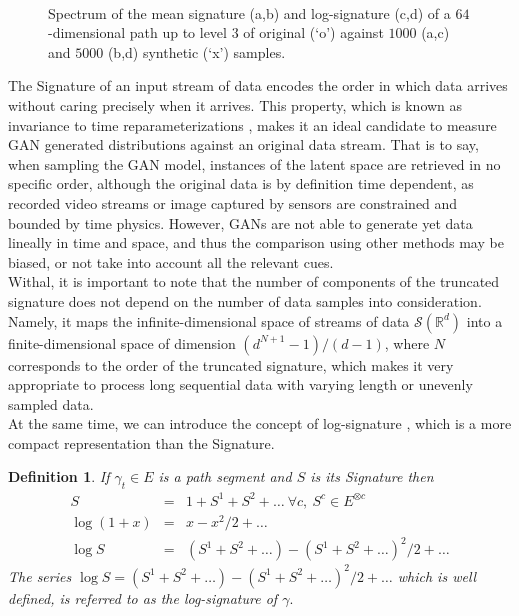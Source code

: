 \documentclass[lettersize,journal]{IEEEtran}
\newtheorem{definition}{Definition}
\begin{document}
\begin{figure}[ht]
\centering
{}
\\
\caption{Spectrum of the mean signature (a,b) and log-signature (c,d) of a $64$-dimensional path up to level $3$ of original (`o') against $1000$ (a,c) and $5000$ (b,d) synthetic (`x') samples.}
\label{fge:07_decurto_and_dezarza}
\end{figure}

The Signature \cite{Lyons2014,Kiraly2019,Graham2013,Chang2019,Fermanian21} of an input stream of data encodes the order in which data arrives without caring precisely when it arrives. This property, which is known as invariance to time reparameterizations \cite{Lyons1998}, makes it an ideal candidate to measure GAN generated distributions against an original data stream. That is to say, when sampling the GAN model, instances of the latent space are retrieved in no specific order, although the original data is by definition time dependent, as recorded video streams or image captured by sensors are constrained and bounded by time physics. However, GANs are not able to generate yet data lineally in time and space, and thus the comparison using other methods may be biased, or not take into account all the relevant cues.
\\

Withal, it is important to note that the number of components of the truncated signature does not depend on the number of data samples into consideration. Namely, it maps the infinite-dimensional space of streams of data $\mathcal{S}(\mathbb{R}^{d})$ into a finite-dimensional space of dimension $(d^{N+1}-1)/(d-1)$, where $N$ corresponds to the order of the truncated signature, which makes it very appropriate to process long sequential data with varying length or unevenly sampled data.
\\

At the same time, we can introduce the concept of log-signature \cite{Liao2019,Morrill2021}, which is a more compact representation than the Signature.

\begin{definition}
If $\gamma _{t}\in E$ is a path segment and $S$ is its Signature then 
\begin{eqnarray*}
S &=&1+S^{1}+S^{2}+\ldots \ \forall c,\ S^{c}\in E^{\otimes c} \\
\log \left( 1+x\right) &=&x-x^{2}/2+\ldots \\
\log S &=&\left( S^{1}+S^{2}+\ldots \right) -\left( S^{1}+S^{2}+\ldots
\right) ^{2}/2+\ldots
\end{eqnarray*}The series $\log S=\left( S^{1}+S^{2}+\ldots \right) -\left(
S^{1}+S^{2}+\ldots \right) ^{2}/2+\ldots $ which is well defined, is
referred to as the log-signature of $\gamma .$
\end{definition}
\end{document}
